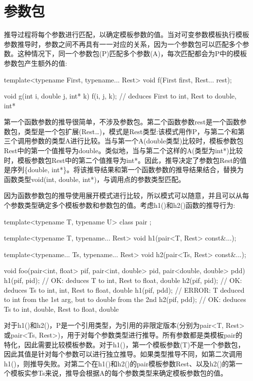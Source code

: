 \section{参数包}

推导过程将每个参数进行匹配，以确定模板参数的值。当对可变参数模板执行模板参数推导时，参数之间不再具有一一对应的关系，因为一个参数包可以匹配多个参数。这种情况下，同一个参数包(P)匹配多个参数(A)，每次匹配都会为P中的模板参数包产生额外的值:

\begin{cpp}
template<typename First, typename... Rest>
void f(First first, Rest... rest);

void g(int i, double j, int* k)
{
	f(i, j, k); // deduces First to int, Rest to {double, int*}
}
\end{cpp}

第一个函数参数的推导很简单，不涉及参数包。第二个函数参数rest是一个函数参数包，类型是一个包扩展(Rest…)，模式是Rest类型:该模式用作P，与第二个和第三个调用参数的类型A进行比较。当与第一个A(double类型)比较时，模板参数包Rest中的第一个值推导为double。类似地，当与第二个这样的A(类型为int*)比较时，模板参数包Rest中的第二个值推导为int*。因此，推导决定了参数包Rest的值是序列\{double, int*\}。将该推导结果和第一个函数参数的推导结果结合，替换为函数类型void(int, double, int*)，与调用点的参数类型匹配。

因为函数参数包的推导使用展开模式进行比较，所以模式可以随意，并且可以从每个参数类型确定多个模板参数和参数包的值。考虑h1()和h2()函数的推导行为:

\begin{cpp}
template<typename T, typename U> class pair { };

template<typename T, typename... Rest>
	void h1(pair<T, Rest> const&...);

template<typename... Ts, typename... Rest>
	void h2(pair<Ts, Rest> const&...);

void foo(pair<int, float> pif, pair<int, double> pid,
pair<double, double> pdd)
{
	h1(pif, pid); // OK: deduces T to int, Rest to {float, double}
	h2(pif, pid); // OK: deduces Ts to {int, int}, Rest to {float, double}
	h1(pif, pdd); // ERROR: T deduced to int from the 1st arg, but to double from the 2nd
	h2(pif, pdd); // OK: deduces Ts to {int, double}, Rest to {float, double}
}
\end{cpp}

对于h1()和h2()，P是一个引用类型，为引用的非限定版本(分别为pair<T, Rest>或pair<Ts, Rest>)，用于对每个参数类型进行推导。所有参数都是类模板pair的特化，因此需要比较模板参数。对于h1()，第一个模板参数(T)不是一个参数包，因此其值是针对每个参数可以进行独立推导。如果类型推导不同，如第二次调用h1()，则推导失败。对第二个在h1()和h2()的pair模板参数Rest、以及h2()的第一个模板实参Ts来说，推导会根据A的每个参数类型来确定模板参数包的值。


